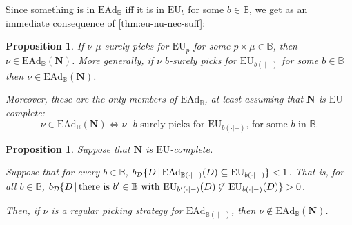 \documentclass[a4paper]{article}
\newtheorem{proposition}[theorem]{Proposition}
\newcommand\D{\mathcal{D}}
\newcommand\N{\mathbf{N}}
\renewcommand\P{\mathbb{P}} %
\renewcommand\c{\mathsf{c}} %
\newcommand\EU{\mathrm{EU}}
\newcommand\EAd{\mathrm{EAd}}
\newcommand{\IB}{\mathbb{B}}
\newcommand{\IP}{\P}
\newcommand{\pb}{b}
\newcommand{\todoinfo}[2][]{\todo[backgroundcolor=orange!80,bordercolor=black,linecolor=gray!80, #1,inline,caption={}]{#2}}
\renewcommand{\color}[1]{}
\newcommand\SetDelimiter[1][]{
	\nonscript\,#1\vert \allowbreak \nonscript\,\mathopen{}}
\providecommand\given{\SetDelimiter}
\newenvironment{CCM rewritten}
{\begingroup\color{blue}} %
{\endgroup}              %
\begin{document}

Since something is in $\EAd_\IB$ iff it is in $\EU_\pb$ for some $\pb\in\IB$, we get as an immediate consequence of \cref{thm:eu-nu-nec-suff}:
\begin{proposition}\label{thm:ead-nu-nec-suff}
If $\nu$ $\mu$-surely picks for $\EU_p$ for some $p\times \mu\in \IB$, then $\nu\in\EAd_\IB(\N)$. More generally, if $\nu$ $\pb$-surely picks for $\EU_{\pb(\cdot|-)}$ for some $\pb\in\IB$ then $\nu\in\EAd_\IB(\N)$. 

Moreover, these are the only members of $\EAd_\IB$, at least assuming that $\N$ is $\EU$-complete: 
$$\nu \in \EAd_\IB(\N) \Leftrightarrow \nu \text{ $\pb$-surely picks for $\EU_{\pb(\cdot|-)}$, for some $\pb$ in $\IB$.}$$

\end{proposition}


	\begin{proposition}\label{thm:ead-nu-reg-nec}
		Suppose that $\N$ is $\EU$-complete. 
		
Suppose that for every $\pb\in\IB$, $\pb_\D\{D\given \EAd_{\IB(\cdot|-)}(D)\subseteq\EU_{\pb(\cdot|-)}\}<1$. That is, for all $\pb\in \IB$, $\pb_\D\{D\given \text{there is $\pb'\in\IB$ with }\EU_{\pb'(\cdot|-)}(D)\not\subseteq\EU_{\pb(\cdot|-)}(D)\}>0$. 
		
		
	Then, if $\nu$ is a regular picking strategy for $\EAd_{\IB(\cdot|-)}$, then $\nu\notin \EAd_\IB(\N)$.
	\end{proposition}
	
\end{document}
